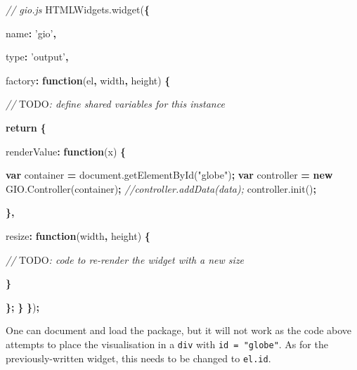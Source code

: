 \documentclass[10pt,]{krantz}
\makeatletter
\newenvironment{Shaded}{\begin{snugshade}}{\end{snugshade}}
\newcommand{\AlertTok}[1]{\textcolor[rgb]{0.33,0.33,0.33}{#1}}
\newcommand{\AttributeTok}[1]{\textcolor[rgb]{0.61,0.61,0.61}{#1}}
\newcommand{\CommentTok}[1]{\textcolor[rgb]{0.37,0.37,0.37}{\textit{#1}}}
\newcommand{\ControlFlowTok}[1]{\textcolor[rgb]{0.27,0.27,0.27}{\textbf{#1}}}
\newcommand{\DataTypeTok}[1]{\textcolor[rgb]{0.27,0.27,0.27}{#1}}
\newcommand{\KeywordTok}[1]{\textcolor[rgb]{0.27,0.27,0.27}{\textbf{#1}}}
\newcommand{\NormalTok}[1]{#1}
\newcommand{\OperatorTok}[1]{\textcolor[rgb]{0.43,0.43,0.43}{\textbf{#1}}}
\newcommand{\StringTok}[1]{\textcolor[rgb]{0.5,0.5,0.5}{#1}}
\newcommand{\VariableTok}[1]{\textcolor[rgb]{0,0,0}{#1}}
\newenvironment{kframe}{%
\medskip{}
\setlength{\fboxsep}{.8em}
 \def\at@end@of@kframe{}%
 \ifinner\ifhmode%
  \def\at@end@of@kframe{\end{minipage}}%
  \begin{minipage}{\columnwidth}%
 \fi\fi%
 \def\FrameCommand##1{\hskip\@totalleftmargin \hskip-\fboxsep
 \colorbox{shadecolor}{##1}\hskip-\fboxsep
     \hskip-\linewidth \hskip-\@totalleftmargin \hskip\columnwidth}%
 \MakeFramed {\advance\hsize-\width
   \@totalleftmargin\z@ \linewidth\hsize
   \@setminipage}}%
 {\par\unskip\endMakeFramed%
 \at@end@of@kframe}
\renewenvironment{Shaded}{\begin{kframe}}{\end{kframe}}
\makeatother
\begin{document}
\begin{Shaded}
\begin{Highlighting}[]
\CommentTok{// gio.js}
\VariableTok{HTMLWidgets}\NormalTok{.}\AttributeTok{widget}\NormalTok{(}\OperatorTok{\{}

  \DataTypeTok{name}\OperatorTok{:} \StringTok{'gio'}\OperatorTok{,}

  \DataTypeTok{type}\OperatorTok{:} \StringTok{'output'}\OperatorTok{,}

  \DataTypeTok{factory}\OperatorTok{:} \KeywordTok{function}\NormalTok{(el}\OperatorTok{,}\NormalTok{ width}\OperatorTok{,}\NormalTok{ height) }\OperatorTok{\{}

    \CommentTok{// }\AlertTok{TODO}\CommentTok{: define shared variables for this instance}

    \ControlFlowTok{return} \OperatorTok{\{}

      \DataTypeTok{renderValue}\OperatorTok{:} \KeywordTok{function}\NormalTok{(x) }\OperatorTok{\{}

        \KeywordTok{var}\NormalTok{ container }\OperatorTok{=} \VariableTok{document}\NormalTok{.}\AttributeTok{getElementById}\NormalTok{(}\StringTok{"globe"}\NormalTok{)}\OperatorTok{;}
        \KeywordTok{var}\NormalTok{ controller }\OperatorTok{=} \KeywordTok{new} \VariableTok{GIO}\NormalTok{.}\AttributeTok{Controller}\NormalTok{(container)}\OperatorTok{;}
        \CommentTok{//controller.addData(data);}
        \VariableTok{controller}\NormalTok{.}\AttributeTok{init}\NormalTok{()}\OperatorTok{;}

      \OperatorTok{\},}

      \DataTypeTok{resize}\OperatorTok{:} \KeywordTok{function}\NormalTok{(width}\OperatorTok{,}\NormalTok{ height) }\OperatorTok{\{}

        \CommentTok{// }\AlertTok{TODO}\CommentTok{: code to re-render the widget with a new size}

      \OperatorTok{\}}

    \OperatorTok{\};}
  \OperatorTok{\}}
\OperatorTok{\}}\NormalTok{)}\OperatorTok{;}
\end{Highlighting}
\end{Shaded}

One can document and load the package, but it will not work as the code above attempts to place the visualisation in a \texttt{div} with \texttt{id\ =\ "globe"}. As for the previously-written widget, this needs to be changed to \texttt{el.id}.
\end{document}
